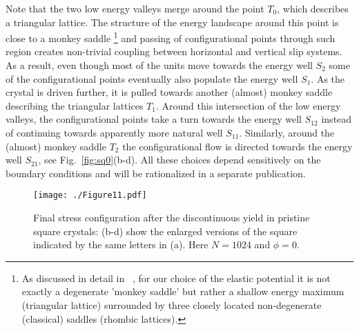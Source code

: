 \documentclass[CRPHYS,Unicode,manuscript]{cedram}
\begin{document}
Note that   the   two low energy valleys merge around the point $T_0$, which describes a  triangular lattice. The structure  of the energy landscape around this point  is close to   a   monkey saddle  \footnote{As discussed in detail in ~\cite{Baggio2019-rs},   for our choice of the elastic potential it is not exactly a  degenerate 'monkey saddle' but rather  a shallow energy maximum (triangular lattice)   surrounded by   three closely located non-degenerate (classical) saddles (rhombic lattices). } and passing of configurational points through such region  creates non-trivial coupling between horizontal   and vertical  slip systems.   As a result, even though most of the units move towards  the energy well $S_2$ some of the configurational points eventually  also populate   the energy well $S_1$.  As the crystal is driven  further,  it is pulled towards another (almost) monkey saddle  describing the  triangular lattices  $T_1$.  Around this intersection  of the low energy valleys,  the configurational points take a turn  towards the energy well $S_{12}$ instead of continuing towards apparently more natural well $S_{11}$. Similarly, around the (almost) monkey saddle $T_2$ the configurational flow is directed towards the energy well $S_{21}$, see Fig.~\ref{fig:sq0}(b-d). All these  choices depend  sensitively on the boundary conditions and will be rationalized in a separate publication.


\begin{figure}[h!]
\centering
\texttt{[image: ./Figure11.pdf]}
\caption{\scriptsize {Final stress configuration after the  discontinuous yield in pristine square crystals: (b-d) show the enlarged versions of the square indicated by the same letters  in (a).
 Here $N=1024$ and $\phi=0$.}
 \label{fig:sq0_2}}
\end{figure}
\end{document}

